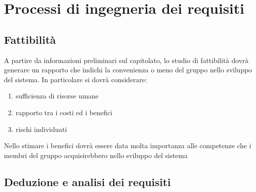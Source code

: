 \section{Processi di ingegneria dei requisiti}{
	\subsection{Fattibilit\`{a}}{
		A partire da informazioni preliminari sul capitolato, lo studio di fattibilit\`{a} dovr\`{a} generare un rapporto che indichi la convenienza o meno del gruppo nello sviluppo del sistema. In particolare si dovr\`{a} considerare:
		\begin{enumerate}
			\item sufficienza di risorse umane
			\item rapporto tra i costi ed i benefici
			\item rischi individuati
		\end{enumerate}
		Nello stimare i benefici dovr\`{a} essere data molta importanza alle competenze che i membri del gruppo acquisirebbero nello sviluppo del sistema
	 }
	\subsection{Deduzione e analisi dei requisiti}{ 
}}
